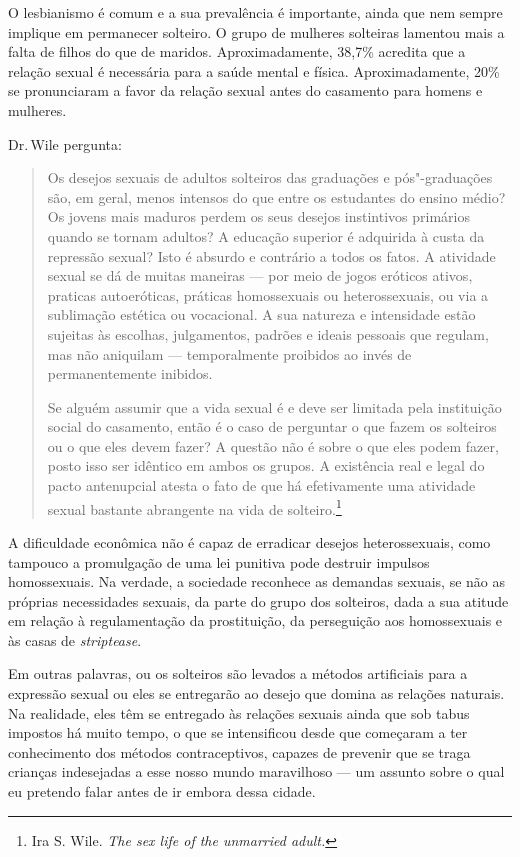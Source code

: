 O lesbianismo é comum e a sua prevalência é importante, ainda que nem
sempre implique em permanecer solteiro. O grupo de mulheres solteiras
lamentou mais a falta de filhos do que de maridos. Aproximadamente,
38,7\% acredita que a relação sexual é necessária para a saúde mental e
física. Aproximadamente, 20\% se pronunciaram a favor da relação sexual
antes do casamento para homens e mulheres.

Dr.\,Wile pergunta:

\begin{quote}
Os desejos sexuais de adultos solteiros das graduações e
pós"-graduações são, em
geral, menos intensos do que entre os estudantes do ensino médio? Os
jovens mais maduros perdem os seus desejos instintivos primários
quando se tornam adultos? A educação superior é adquirida à custa da
repressão sexual? Isto é absurdo e contrário a todos os fatos. A
atividade sexual se dá de muitas maneiras --- por meio de jogos eróticos
ativos, praticas autoeróticas, práticas homossexuais ou heterossexuais,
ou via a sublimação estética ou vocacional. A sua natureza e intensidade
estão sujeitas às escolhas, julgamentos, padrões e ideais pessoais que
regulam, mas não aniquilam --- temporalmente proibidos ao invés de
permanentemente inibidos.

Se alguém assumir que a vida sexual é e deve ser limitada pela
instituição social do casamento, então é o caso de perguntar o que fazem
os solteiros ou o que eles devem fazer? A questão não é sobre o que eles
podem fazer, posto isso ser idêntico em ambos os grupos. A existência
real e legal do pacto antenupcial atesta o fato de que há efetivamente
uma atividade sexual bastante abrangente na vida de
solteiro.\footnote{Ira S. Wile. \emph{The sex life of the unmarried
  adult.}}
\end{quote}

\asterisc

A dificuldade econômica não é capaz de erradicar desejos heterossexuais,
como tampouco a promulgação de uma lei punitiva pode destruir impulsos
homossexuais. Na verdade, a sociedade reconhece as demandas sexuais, se
não as próprias necessidades sexuais, da parte do grupo dos solteiros,
dada a sua atitude em relação à regulamentação da prostituição, da
perseguição aos homossexuais e às casas de \emph{striptease}.

Em outras palavras, ou os solteiros são levados a métodos artificiais
para a expressão sexual ou eles se entregarão ao desejo que domina as
relações naturais. Na realidade, eles têm se entregado às relações
sexuais ainda que sob tabus impostos há muito tempo, o que se intensificou desde que começaram a ter conhecimento dos
métodos contraceptivos, capazes de prevenir que se traga crianças
indesejadas a esse nosso mundo maravilhoso --- um assunto sobre o qual eu
pretendo falar antes de ir embora dessa cidade.

